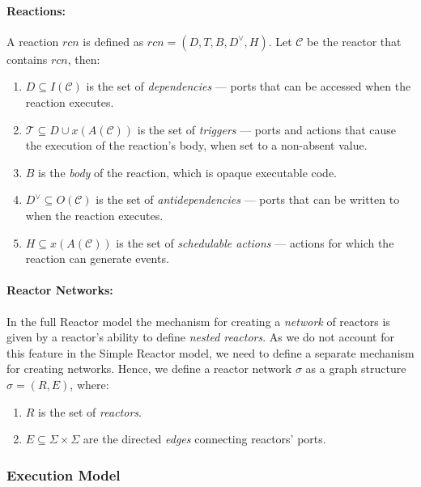 \paragraph{Reactions:}

\noindent A reaction $rcn$ is defined as $rcn = (D, T, B, D^\vee, H)$. Let $\mathcal{C}$ be the reactor that contains $rcn$, then:

\begin{enumerate}
    \item $D \subseteq I(\mathcal{C})$ is the set of \emph{dependencies} --- ports that can be accessed when the reaction executes.
    \item $\mathcal{T} \subseteq D \cup x(A(\mathcal{C}))$ is the set of \emph{triggers} --- ports and actions that cause the execution of the reaction's body, when set to a non-absent value.
    \item $B$ is the \emph{body} of the reaction, which is opaque executable code.
    \item $D^\vee \subseteq O(\mathcal{C})$ is the set of \emph{antidependencies} --- ports that can be written to when the reaction executes.
    \item $H \subseteq x(A(\mathcal{C}))$ is the set of \emph{schedulable actions} --- actions for which the reaction can generate events.
\end{enumerate}

\paragraph{Reactor Networks:}

In the full Reactor model the mechanism for creating a \emph{network} of reactors is given by a reactor's ability to define \emph{nested reactors}. 
As we do not account for this feature in the Simple Reactor model, we need to define a separate mechanism for creating networks.
Hence, we define a reactor network $\sigma$ as a graph structure $\sigma = (R, E)$, where:

\begin{enumerate}
    \item $R$ is the set of \emph{reactors}.
    \item $E \subseteq \Sigma \times \Sigma$ are the directed \emph{edges} connecting reactors' ports.
\end{enumerate}

\subsubsection{Execution Model}
\label{section:exec-model}

